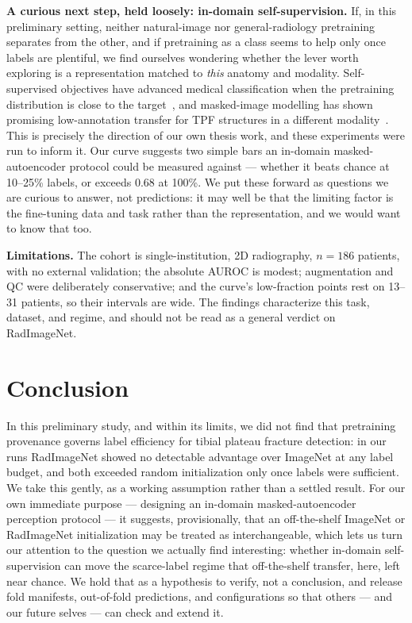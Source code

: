 \documentclass[conference]{IEEEtran}
\begin{document}
\textbf{A curious next step, held loosely: in-domain self-supervision.} If, in this
preliminary setting, neither natural-image nor general-radiology pretraining
separates from the other, and if pretraining as a class seems to help only once labels
are plentiful, we find ourselves wondering whether the lever worth exploring is a
representation matched to \emph{this} anatomy and modality. Self-supervised objectives
have advanced medical classification when the pretraining distribution is close to the
target~\cite{azizi21,chen20simclr}, and masked-image modelling has shown promising
low-annotation transfer for TPF structures in a different modality~\cite{yue25mae}.
This is precisely the direction of our own thesis work, and these experiments were run
to inform it. Our curve suggests two simple bars an in-domain masked-autoencoder
protocol could be measured against --- whether it beats chance at 10--25\% labels, or
exceeds $0.68$ at 100\%. We put these forward as questions we are curious to answer,
not predictions: it may well be that the limiting factor is the fine-tuning data and
task rather than the representation, and we would want to know that too.

\textbf{Limitations.} The cohort is single-institution, 2D radiography, $n=186$
patients, with no external validation; the absolute AUROC is modest; augmentation and
QC were deliberately conservative; and the curve's low-fraction points rest on 13--31
patients, so their intervals are wide. The findings characterize this task, dataset,
and regime, and should not be read as a general verdict on RadImageNet.

\section{Conclusion}
In this preliminary study, and within its limits, we did not find that pretraining
provenance governs label efficiency for tibial plateau fracture detection: in our runs
RadImageNet showed no detectable advantage over ImageNet at any label budget, and both
exceeded random initialization only once labels were sufficient. We take this
gently, as a working assumption rather than a settled result. For our own immediate
purpose --- designing an in-domain masked-autoencoder perception protocol --- it
suggests, provisionally, that an off-the-shelf ImageNet or RadImageNet initialization
may be treated as interchangeable, which lets us turn our attention to the question we
actually find interesting: whether in-domain self-supervision can move the scarce-label
regime that off-the-shelf transfer, here, left near chance. We hold that as a
hypothesis to verify, not a conclusion, and release fold manifests, out-of-fold
predictions, and configurations so that others --- and our future selves --- can check
and extend it.
\end{document}

